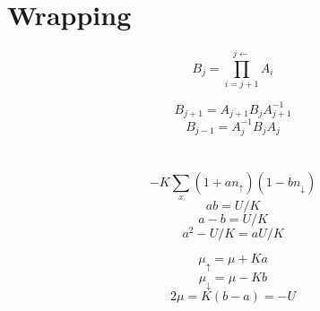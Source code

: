 \documentclass[onecolumn,english,prl,showpacs]{revtex4}
\newcommand{\Up}{{\uparrow}}
\newcommand{\Dn}{{\downarrow}}
\begin{document}
\section{Wrapping}

\begin{equation}
 B_j = {\prod_{i=j+1}^{j\leftarrow}} A_i
\end{equation}

\begin{equation}
 B_{j+1} = A_{j+1} B_j A_{j+1}^{-1}
\end{equation}
\begin{equation}
 B_{j-1} = A_{j}^{-1} B_j A_{j}
\end{equation}

\section{}


\begin{equation}
 -K\sum_x (1+an_\Up)(1-bn_\Dn)
\end{equation}
\begin{equation}
 ab = U/K
\end{equation}
\begin{equation}
 a-b = U/K
\end{equation}
\begin{equation}
 a^2-U/K=aU/K
\end{equation}

\begin{equation}
 \mu_\Up = \mu + Ka
\end{equation}
\begin{equation}
 \mu_\Dn = \mu - Kb
\end{equation}
\begin{equation}
 2\mu = K(b-a) = -U
\end{equation}
\end{document}
